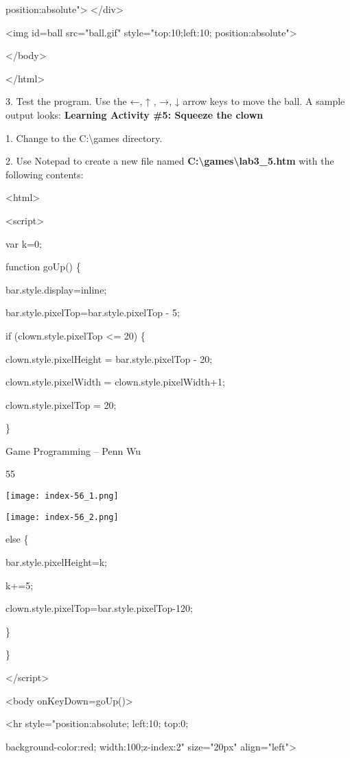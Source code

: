 \documentclass[
]{article}
\begin{document}
position:absolute"\textgreater{} \textless/div\textgreater{}

\textless img id=ball src="ball.gif" style="top:10;left:10;
position:absolute"\textgreater{}

\textless/body\textgreater{}

\textless/html\textgreater{}

3. Test the program. Use the ←, ↑ , →, ↓ arrow keys to move the ball. A
sample output looks: \textbf{Learning Activity \#5: Squeeze the clown}

1. Change to the C:\textbackslash games directory.

2. Use Notepad to create a new file named
\textbf{C:\textbackslash games\textbackslash lab3\_5.htm} with the
following contents:

\textless html\textgreater{}

\textless script\textgreater{}

var k=0;

function goUp() \{

bar.style.display=\textquotesingle inline\textquotesingle;

bar.style.pixelTop=bar.style.pixelTop - 5;

if (clown.style.pixelTop \textless= 20) \{

clown.style.pixelHeight = bar.style.pixelTop - 20;

clown.style.pixelWidth = clown.style.pixelWidth+1;

clown.style.pixelTop = 20;

\}

Game Programming -- Penn Wu

55

\protect\hypertarget{index_split_004.htmlux5cux23p56}{}{}\texttt{[image: index-56\_1.png]}

\texttt{[image: index-56\_2.png]}

else \{

bar.style.pixelHeight=k;

k+=5;

clown.style.pixelTop=bar.style.pixelTop-120;

\}

\}

\textless/script\textgreater{}

\textless body onKeyDown=goUp()\textgreater{}

\textless hr style="position:absolute; left:10; top:0;

background-color:red; width:100;z-index:2" size="20px"
align="left"\textgreater{}
\end{document}

